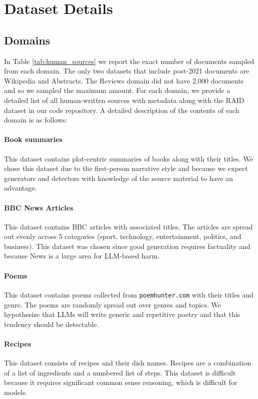 \documentclass[11pt]{article}
\begin{document}
\section{Dataset Details}
\label{app:dataset}
\subsection{Domains}
\label{app:domains}
In Table \ref{tab:human_sources} we report the exact number of documents sampled from each domain. The only two datasets that include post-2021 documents are Wikipedia and Abstracts. The Reviews domain did not have 2,000 documents and so we sampled the maximum amount. For each domain, we provide a detailed list of all human-written sources with metadata along with the RAID dataset in our code repository. A detailed description of the contents of each domain is as follows:

\paragraph{Book summaries} \cite{bamman2013new} This dataset contains plot-centric summaries of books along with their titles. We chose this dataset due to the first-person narrative style and because we expect generators and detectors with knowledge of the source material to have an advantage.

\paragraph{BBC News Articles} \cite{greene06icml} This dataset contains BBC articles with associated titles. The articles are spread out evenly across 5 categories (sport, technology, entertainment, politics, and business). This dataset was chosen since good generation requires factuality and because News is a large area for LLM-based harm.

\paragraph{Poems} \cite{poemsdataset} This dataset contains poems collected from \texttt{poemhunter.com} with their titles and genre. The poems are randomly spread out over genres and topics. We hypothesize that LLMs will write generic and repetitive poetry and that this tendency should be detectable. 

\paragraph{Recipes} \cite{bien-etal-2020-recipenlg} This dataset consists of recipes and their dish names. Recipes are a combination of a list of ingredients and a numbered list of steps. This dataset is difficult because it requires significant common sense reasoning, which is difficult for models.
\end{document}
